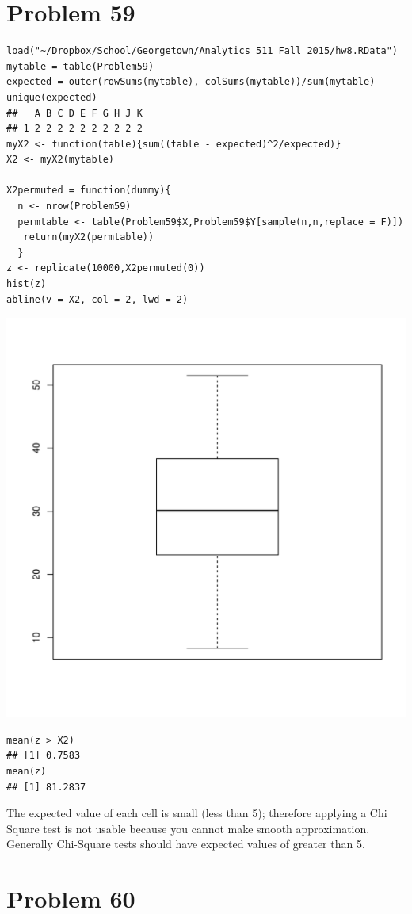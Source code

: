 \documentclass{article}\usepackage[]{graphicx}\usepackage[]{color}
\makeatletter
\newenvironment{kframe}{%
 \def\at@end@of@kframe{}%
 \ifinner\ifhmode%
  \def\at@end@of@kframe{\end{minipage}}%
  \begin{minipage}{\columnwidth}%
 \fi\fi%
 \def\FrameCommand##1{\hskip\@totalleftmargin \hskip-\fboxsep
 \colorbox{shadecolor}{##1}\hskip-\fboxsep
     \hskip-\linewidth \hskip-\@totalleftmargin \hskip\columnwidth}%
 \MakeFramed {\advance\hsize-\width
   \@totalleftmargin\z@ \linewidth\hsize
   \@setminipage}}%
 {\par\unskip\endMakeFramed%
 \at@end@of@kframe}
\newenvironment{knitrout}{}{} %
\makeatother
\begin{document}
\section*{Problem 59}
\begin{knitrout}
\color{fgcolor}\begin{kframe}
\begin{verbatim}
load("~/Dropbox/School/Georgetown/Analytics 511 Fall 2015/hw8.RData")
mytable = table(Problem59)
expected = outer(rowSums(mytable), colSums(mytable))/sum(mytable)
unique(expected)
##   A B C D E F G H J K
## 1 2 2 2 2 2 2 2 2 2 2
myX2 <- function(table){sum((table - expected)^2/expected)}
X2 <- myX2(mytable)

X2permuted = function(dummy){
  n <- nrow(Problem59)
  permtable <- table(Problem59$X,Problem59$Y[sample(n,n,replace = F)])
   return(myX2(permtable))
  }
z <- replicate(10000,X2permuted(0))
hist(z)
abline(v = X2, col = 2, lwd = 2)
\end{verbatim}
\end{kframe}
\includegraphics[width=0.33\linewidth]{figure/unnamed-chunk-3-1} 
\begin{kframe}\begin{verbatim}
mean(z > X2)
## [1] 0.7583
mean(z)
## [1] 81.2837
\end{verbatim}
\end{kframe}
\end{knitrout}
The expected value of each cell is small (less than 5); therefore applying a Chi Square test is not usable because you cannot make smooth approximation. Generally Chi-Square tests should have expected values of greater than 5.
\section*{Problem 60}
\end{document}
